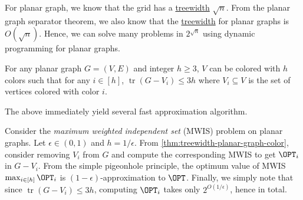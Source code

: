 \begin{remark}
	For planar graph, we know that the grid has a \hyperref[def:treewidth]{treewidth} \(\sqrt{n} \). From the planar graph separator theorem, we also know that the \hyperref[def:treewidth]{treewidth} for planar graphs is \(O(\sqrt{n} )\). Hence, we can solve many problems in \(2^{\sqrt{n} }\) using dynamic programming for planar graphs.
\end{remark}

\begin{theorem}\label{thm:treewidth-planar-graph-color}
	For any planar graph \(G = (V, E)\) and integer \(h \geq 3\), \(V\) can be colored with \(h\) colors such that for any \(i \in [h]\), \(\operatorname{tr}(G - V_i) \leq 3h\) where \(V_i \subseteq V\) is the set of vertices colored with color \(i\).
\end{theorem}

The above immediately yield several fast approximation algorithm.

\begin{eg}
	Consider the \emph{maximum weighted independent set} (MWIS) problem on planar graphs. Let \(\epsilon \in (0, 1)\) and \(h = 1 / \epsilon \). From \autoref{thm:treewidth-planar-graph-color}, consider removing \(V_i\) from \(G\) and compute the corresponding MWIS to get \(\OPT_i\) in \(G - V_i\). From the simple pigeonhole principle, the optimum value of MWIS \(\max _{i\in [h]} \OPT_i\) is \((1-\epsilon)\)-approximation to \(\OPT\). Finally, we simply note that since \(\operatorname{tr}(G-V_i) \leq 3h\), computing \(\OPT_i\) takes only \(2^{O(1 / \epsilon )}\), hence in total.
\end{eg}